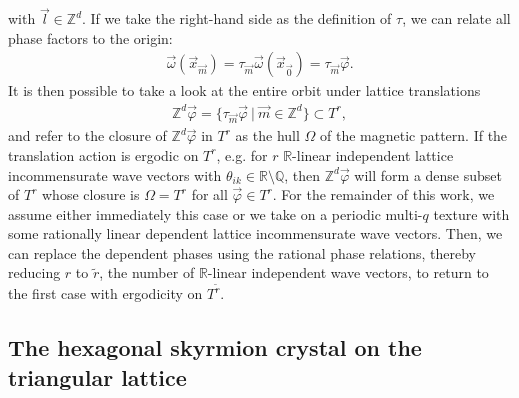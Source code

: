 \documentclass[submission, Phys]{SciPost}
\begin{document}
with $\vec{l}\in\mathbb{Z}^d$.
If we take the right-hand side as the definition of $\tau$, we can relate all phase factors to the origin:
\begin{align}
    \vec{\omega}(\vec{x}_{\vec{m}}) = \tau_{\vec{m}}  \vec{\omega}(\vec{x}_{\vec{0}})
    = \tau_{\vec{m}}  \vec{\varphi} .
    \label{eq:phaseorigin}
\end{align}
It is then possible to take a look at the entire orbit under lattice translations
\begin{align}
    \mathbb{Z}^d \vec{\varphi}
    = \lbrace \tau_{\vec{m}}  \vec{\varphi}  ~|~ \vec{m} \in \mathbb{Z}^d\rbrace  \subset T^r,
\end{align}
and refer to the closure of $\mathbb{Z}^d \vec{\varphi}$ in $T^r$ as the hull $\Omega$ of the magnetic pattern.
If the translation action is ergodic on $T^r$, e.g. for $r$ $\mathbb{R}$-linear independent lattice incommensurate wave vectors with $\theta_{ik}\in\mathbb{R}\setminus\mathbb{Q}$, then $\mathbb{Z}^d \vec{\varphi}$ will form a dense subset of $T^r$ whose closure is $\Omega = T^r$ for all $\vec{\varphi} \in T^r$.
For the remainder of this work, we assume either immediately this case or we take on a periodic multi-$q$ texture with some rationally linear dependent lattice incommensurate wave vectors.
Then, we can replace the dependent phases using the rational phase relations, thereby reducing
$r$ to $\tilde{r}$, the number of $\mathbb{R}$-linear independent wave vectors, to return to the first case with ergodicity on $T^{\tilde{r}}$.

\subsection{The hexagonal skyrmion crystal on the triangular lattice}
\label{subsec:our_model}
\end{document}
